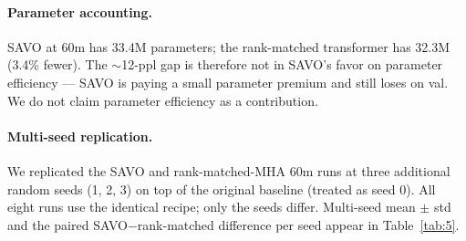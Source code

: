 \paragraph{Parameter accounting.} SAVO at 60m has 33.4M parameters; the rank-matched transformer has 32.3M (3.4\% fewer). The $\sim$12-ppl gap is therefore not in SAVO's favor on parameter efficiency --- SAVO is paying a small parameter premium and still loses on val. We do not claim parameter efficiency as a contribution.

\paragraph{Multi-seed replication.} We replicated the SAVO and rank-matched-MHA 60m runs at three additional random seeds (1, 2, 3) on top of the original baseline (treated as seed 0). All eight runs use the identical recipe; only the seeds differ. Multi-seed mean $\pm$ std and the paired SAVO$-$rank-matched difference per seed appear in Table~\ref{tab:5}.

